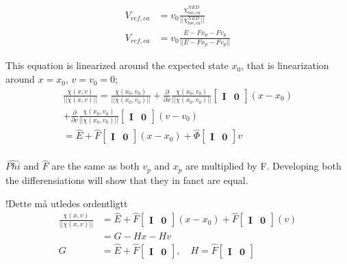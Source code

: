 \begin{align}
        V_{ref,ca} & = v_0 \frac{\chi^{NED}_{los,ca} }{|| \chi^{NED}_{los,ca} ||} \\
        V_{ref,ca} & = v_0 \frac{E - F x_p - F v_p }{|| E - F x_p - F v_p ||}
\end{align}

This equation is linearized around the expected state $x_0$, that is linearization around $x=x_0$, $v=v_0=0$;
\begin{multline}
    \frac{\chi(x,v)}{|| \chi(x,v) ||}  = \frac{\chi(x_0,v_0)}{|| \chi(x_0,v_0) ||} + \frac{\partial}{\partial x} \frac{\chi(x_0,v_0)}{|| \chi(x_0,v_0) ||}  \begin{bmatrix}\mathbf{I}  &\mathbf{0}\end{bmatrix}(x-x_0) \\+ \frac{\partial}{\partial v} \frac{\chi(x_0,v_0)}{|| \chi(x_0,v_0) ||}  \begin{bmatrix}\mathbf{I}  &\mathbf{0}\end{bmatrix}(v-v_0) \\
      = \hat{E} + \hat{F} \begin{bmatrix}\mathbf{I}  &\mathbf{0}\end{bmatrix}(x-x_0)  + \hat{\Phi} \begin{bmatrix}\mathbf{I}  &\mathbf{0}\end{bmatrix}v \\
\end{multline}

$\hat{Phi}$ and $\hat{F}$ are the same as both $v_p$ and $x_p$ are multiplied by F. Developing both the differensiations will show that they in fanct are equal.

!Dette må utledes ordentligtt
\begin{align}
    \frac{\chi(x,v)}{|| \chi(x,v) ||} & = \hat{E} + \hat{F} \begin{bmatrix}\mathbf{I}  &\mathbf{0}\end{bmatrix}(x-x_0)  + \hat{F} \begin{bmatrix}\mathbf{I}  &\mathbf{0}\end{bmatrix}(v) \\
    & = G - H x  - H v \\
    G &= \hat{E} + \hat{F} \begin{bmatrix}\mathbf{I}  &\mathbf{0}\end{bmatrix}, \quad H = \hat{F} \begin{bmatrix}\mathbf{I}  &\mathbf{0}\end{bmatrix}
\end{align}


